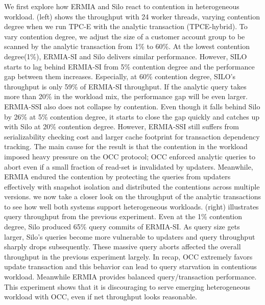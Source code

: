
We first explore how ERMIA and Silo react to contention in heterogeneous workload.  (left) shows the throughput with 24 worker threads, varying contention degree when we run TPC-E with the analytic transaction (TPCE-hybrid). To vary contention degree, we adjust the size of a customer account group to be scanned by the analytic transaction from 1\% to 60\%. At the lowest contention degree(1\%), ERMIA-SI and Silo delivers similar performance. However, SILO starts to lag behind ERMIA-SI from 5\% contention degree and the performance gap between them increases. Especially, at 60\% contention degree, SILO's throughput is only 59\% of ERMIA-SI throughput. If the analytic query takes more than 20\% in the workload mix, the performance gap will be even larger. ERMIA-SSI also does not collapse by contention. Even though it falls behind Silo by 26\% at 5\% contention degree, it starts to close the gap quickly and catches up with Silo at 20\% contention degree. However, ERMIA-SSI still suffers from serializability checking cost and larger cache footprint for transaction dependency tracking.
The main cause for the result is that the contention in the workload imposed heavy pressure on the OCC protocol; OCC enforced analytic queries to abort even if a small fraction of read-set is invalidated by updaters. Meanwhile, ERMIA endured the contention by protecting the queries from updaters effectively with snapshot isolation and distributed the contentions across multiple versions. 
we now take a closer look on the throughput of the analytic transactions to see how well both systems support heterogeneous workloads.  (right) illustrates query throughput from the previous experiment. Even at the 1\% contention degree, Silo produced 65\% query commits of ERMIA-SI. As query size gets larger, Silo's queries become more vulnerable to updaters and query throughput sharply drops subsequently. These massive query aborts affected the overall throughput in the previous experiment largely. In recap, OCC extremely favors update transaction and this behavior can lead to query starvation in contentious workload. Meanwhile ERMIA provides balanced query/transaction performance. This experiment shows that it is discouraging to serve emerging heterogeneous workload with OCC, even if net throughput looks reasonable. 
   
